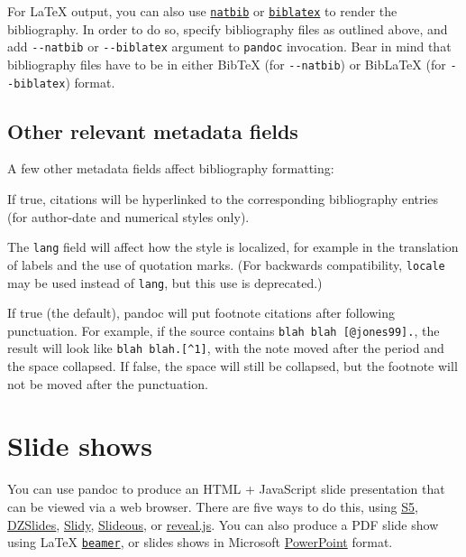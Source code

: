 \documentclass[]{article}
\providecommand{\tightlist}{%
  \setlength{\itemsep}{0pt}\setlength{\parskip}{0pt}}
\begin{document}
For LaTeX output, you can also use
\href{https://ctan.org/pkg/natbib}{\texttt{natbib}} or
\href{https://ctan.org/pkg/biblatex}{\texttt{biblatex}} to render the
bibliography. In order to do so, specify bibliography files as outlined
above, and add \texttt{-\/-natbib} or \texttt{-\/-biblatex} argument to
\texttt{pandoc} invocation. Bear in mind that bibliography files have to
be in either BibTeX (for \texttt{-\/-natbib}) or BibLaTeX (for
\texttt{-\/-biblatex}) format.

\hypertarget{other-relevant-metadata-fields}{%
\subsection{Other relevant metadata
fields}\label{other-relevant-metadata-fields}}

A few other metadata fields affect bibliography formatting:

\begin{description}
\tightlist
\item[\texttt{link-citations}]
If true, citations will be hyperlinked to the corresponding bibliography
entries (for author-date and numerical styles only).
\item[\texttt{lang}]
The \texttt{lang} field will affect how the style is localized, for
example in the translation of labels and the use of quotation marks.
(For backwards compatibility, \texttt{locale} may be used instead of
\texttt{lang}, but this use is deprecated.)
\item[\texttt{notes-after-punctuation}]
If true (the default), pandoc will put footnote citations after
following punctuation. For example, if the source contains
\texttt{blah\ blah\ {[}@jones99{]}.}, the result will look like
\texttt{blah\ blah.{[}\^{}1{]}}, with the note moved after the period
and the space collapsed. If false, the space will still be collapsed,
but the footnote will not be moved after the punctuation.
\end{description}

\hypertarget{slide-shows}{%
\section{Slide shows}\label{slide-shows}}

You can use pandoc to produce an HTML + JavaScript slide presentation
that can be viewed via a web browser. There are five ways to do this,
using \href{https://meyerweb.com/eric/tools/s5/}{S5},
\href{http://paulrouget.com/dzslides/}{DZSlides},
\href{https://www.w3.org/Talks/Tools/Slidy2/}{Slidy},
\href{https://goessner.net/articles/slideous/}{Slideous}, or
\href{https://revealjs.com/}{reveal.js}. You can also produce a PDF
slide show using LaTeX
\href{https://ctan.org/pkg/beamer}{\texttt{beamer}}, or slides shows in
Microsoft
\href{https://en.wikipedia.org/wiki/Microsoft_PowerPoint}{PowerPoint}
format.
\end{document}
